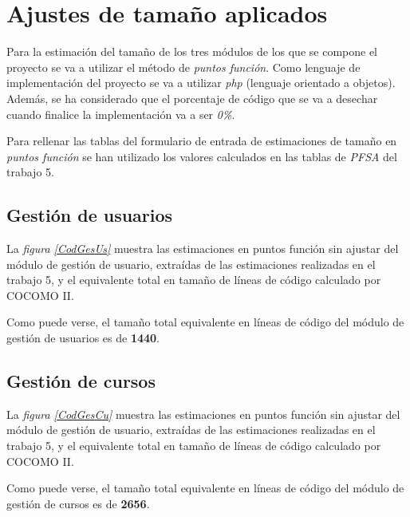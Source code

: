 \documentclass[11pt,a4paper,spanish,twoside]{book}
\begin{document}
\tableofcontents
\listoffigures

\chapter{Ajustes de tamaño aplicados}

Para la estimación del tamaño de los tres módulos de los que se compone el
proyecto se va a utilizar el método de \emph{puntos función}. Como lenguaje
de implementación del proyecto se va a utilizar \emph{php} (lenguaje
orientado a objetos). Además, se ha considerado que el porcentaje de código que
se va a desechar cuando finalice la implementación va a ser \emph{0\%}.

Para rellenar las tablas del formulario de entrada de estimaciones de tamaño
en \emph{puntos función} se han utilizado los valores calculados en las tablas
de \emph{PFSA} del trabajo 5.

\section{Gestión de usuarios}
La \emph{figura \ref{CodGesUs}} muestra las estimaciones en puntos función sin
ajustar del módulo de gestión de usuario, extraídas de las estimaciones
realizadas en el trabajo 5, y el equivalente total en tamaño de líneas de
código calculado por COCOMO II.


Como puede verse, el tamaño total equivalente en líneas de código del módulo
de gestión de usuarios es de \textbf{1440}.

\section{Gestión de cursos}
La \emph{figura \ref{CodGesCu}} muestra las estimaciones en puntos función sin
ajustar del módulo de gestión de usuario, extraídas de las estimaciones
realizadas en el trabajo 5, y el equivalente total en tamaño de líneas de
código calculado por COCOMO II.


Como puede verse, el tamaño total equivalente en líneas de código del módulo
de gestión de cursos es de \textbf{2656}.
\end{document}
